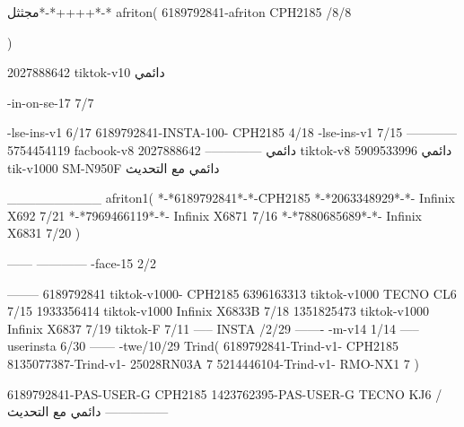 مجثثل*-*++++*-*
afriton(
6189792841-afriton CPH2185  /8/8

)

2027888642 tiktok-v10
دائمي

-in-on-se-17 7/7

-lse-ins-v1 6/17
6189792841-INSTA-100- CPH2185 4/18
-lse-ins-v1 7/15
------------
5754454119 facbook-v8
دائمي
--------------
2027888642 tiktok-v8
دائمي
5909533996 tik-v1000  SM-N950F
دائمي مع التحديث

__________
afriton1(
*-*6189792841*-*-CPH2185
*-*2063348929*-*-  Infinix X692  7/21
*-*7969466119*-*-  Infinix X6871  7/16
*-*7880685689*-*-   Infinix X6831  7/20
)


------
------------
-face-15 2/2

--------
6189792841 tiktok-v1000- CPH2185 
6396163313 tiktok-v1000 TECNO CL6  7/15
1933356414 tiktok-v1000 Infinix X6833B  7/18
1351825473 tiktok-v1000 Infinix X6837  7/19
 tiktok-F   7/11
-----
 INSTA /2/29
-------
-m-v14 1/14
-----
userinsta 6/30
------
-twe/10/29
Trind(
6189792841-Trind-v1- CPH2185 
8135077387-Trind-v1- 25028RN03A 7
5214446104-Trind-v1- RMO-NX1 7
)


6189792841-PAS-USER-G CPH2185 
1423762395-PAS-USER-G TECNO KJ6  /دائمي مع التحديث
    ---------------
